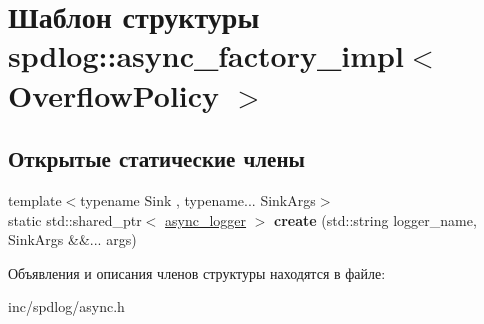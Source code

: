 \hypertarget{structspdlog_1_1async__factory__impl}{}\section{Шаблон структуры spdlog\+:\+:async\+\_\+factory\+\_\+impl$<$ Overflow\+Policy $>$}
\label{structspdlog_1_1async__factory__impl}
\subsection*{Открытые статические члены}
\begin{DoxyCompactItemize}
\item 
\mbox{\label{structspdlog_1_1async__factory__impl_aa39b4c4216d822e1788beccde29160d9}} 
{\footnotesize template$<$typename Sink , typename... Sink\+Args$>$ }\\static std\+::shared\+\_\+ptr$<$ \hyperlink{classspdlog_1_1async__logger}{async\+\_\+logger} $>$ {\bfseries create} (std\+::string logger\+\_\+name, Sink\+Args \&\&... args)
\end{DoxyCompactItemize}


Объявления и описания членов структуры находятся в файле\+:\begin{DoxyCompactItemize}
\item 
inc/spdlog/async.\+h\end{DoxyCompactItemize}
